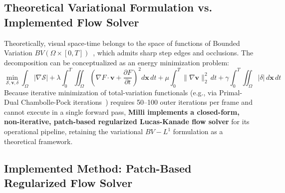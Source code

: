 \documentclass[11pt]{article}
\begin{document}
\subsection{Theoretical Variational Formulation vs. Implemented Flow Solver}

Theoretically, visual space-time belongs to the space of functions of Bounded Variation $BV(\Omega \times [0, T])$~\citep{rudin1992nonlinear}, which admits sharp step edges and occlusions. The decomposition can be conceptualized as an energy minimization problem:
\begin{equation}
\min_{\mathcal{S}, \mathbf{v}, \delta} \int_{\Omega} |\nabla \mathcal{S}| + \lambda \int_0^T \iint_{\Omega} \left( \nabla F \cdot \mathbf{v} + \frac{\partial F}{\partial t} \right)^2 d\mathbf{x}\,dt + \mu \int_0^T \|\nabla \mathbf{v}\|_2^2\,dt + \gamma \int_0^T \iint_{\Omega} |\delta|\,d\mathbf{x}\,dt
\end{equation}
Because iterative minimization of total-variation functionals (e.g., via Primal-Dual Chambolle-Pock iterations~\citep{chambollepock2011}) requires 50--100 outer iterations per frame and cannot execute in a single forward pass, \textbf{Milli implements a closed-form, non-iterative, patch-based regularized Lucas-Kanade flow solver} for its operational pipeline, retaining the variational $BV-L^1$ formulation as a theoretical framework.

\subsection{Implemented Method: Patch-Based Regularized Flow Solver}
\end{document}
